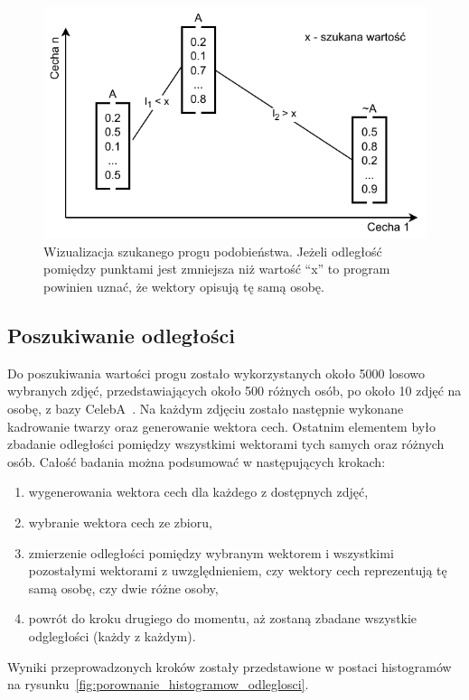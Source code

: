 \begin{figure}[H]
    \centering
    \includegraphics[width=1\textwidth]{./images/szukanie_progu}
    \caption{ Wizualizacja szukanego progu podobieństwa. Jeżeli odległość pomiędzy punktami jest
    zmniejsza niż wartość ``x'' to program powinien uznać, że wektory opisują tę samą osobę. }
    \customsource
    \label{fig:szukanie_progu}
\end{figure}

\pagebreak

\subsection{Poszukiwanie odległości}

Do poszukiwania wartości progu zostało wykorzystanych około \num{5000} losowo wybranych zdjęć,
przedstawiających około \num{500} różnych osób, po około \num{10} zdjęć na osobę,
z bazy CelebA~\cite{liu2015faceattributes}.
Na każdym zdjęciu zostało następnie wykonane kadrowanie twarzy oraz generowanie wektora cech.
Ostatnim elementem było zbadanie odległości pomiędzy wszystkimi wektorami tych samych oraz różnych osób.
Całość badania można podsumować w następujących krokach:
\begin{enumerate}
    \item wygenerowania wektora cech dla każdego z dostępnych zdjęć,
    \item wybranie wektora cech ze zbioru,
    \item zmierzenie odległości pomiędzy wybranym wektorem i wszystkimi pozostałymi wektorami z uwzględnieniem,
    czy wektory cech reprezentują tę samą osobę, czy dwie różne osoby,
    \item powrót do kroku drugiego do momentu, aż zostaną zbadane wszystkie odgległości (każdy z każdym).
\end{enumerate}
Wyniki przeprowadzonych kroków zostały przedstawione w postaci histogramów na rysunku~\ref{fig:porownanie_histogramow_odleglosci}.


